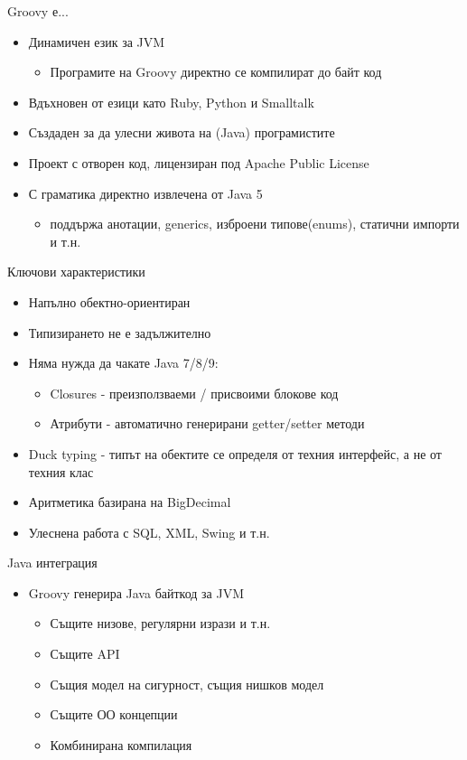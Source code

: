 \documentclass[compress,red]{beamer}
\begin{document}
\begin{frame}{Groovy е...}
  \transdissolve
  \begin{itemize}
  \item Динамичен език за JVM
    \begin{itemize}
      \item Програмите на Groovy директно се компилират до байт код
    \end{itemize}
  \item Вдъхновен от езици като Ruby, Python и Smalltalk
  \item Създаден за да улесни живота на (Java) програмистите
  \item Проект с отворен код, лицензиран под Apache Public License
  \item С граматика директно извлечена от Java 5
    \begin{itemize}
      \item поддържа анотации, generics, изброени типове(enums),
        статични импорти и т.н.
    \end{itemize}
  \end{itemize}
\end{frame}

\begin{frame}{Ключови характеристики}
  \transdissolve
  \begin{itemize}
  \item Напълно обектно-ориентиран
  \item Типизирането не е задължително
  \item Няма нужда да чакате Java 7/8/9:
    \begin{itemize}
      \item Closures - преизползваеми / присвоими блокове код
      \item Атрибути - автоматично генерирани getter/setter методи
    \end{itemize}
  \item Duck typing - типът на обектите се определя от техния
    интерфейс, а не от техния клас
  \item Аритметика базирана на BigDecimal
  \item Улеснена работа с SQL, XML, Swing и т.н.
  \end{itemize}
\end{frame}

\begin{frame}{Java интеграция}
  \transdissolve
  \begin{itemize}
  \item Groovy генерира Java байткод за JVM
    \begin{itemize}
      \item Същите низове, регулярни изрази и т.н.
      \item Същите API
      \item Същия модел на сигурност, същия нишков модел
      \item Същите ОО концепции
      \item Комбинирана компилация
    \end{itemize}
  \end{itemize}
\end{frame}
\end{document}
